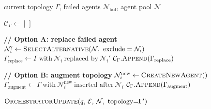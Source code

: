 \begin{algorithm}[H]
\caption{TopologyMutation (structural fallback)}
\begin{algorithmic}[1]
\Require current topology $\Gamma$, failed agents $\mathcal{N}_{\text{fail}}$, agent pool $\mathcal{N}$

\State $\mathcal{C}_{\Gamma} \leftarrow [\,]$


    \State \textbf{// Option A: replace failed agent}
    \State $\mathcal{N}_i' \leftarrow \textsc{SelectAlternative}(\mathcal{N},\ \text{exclude}=\mathcal{N}_i)$
    \State $\Gamma_{\text{replace}} \leftarrow \Gamma\ \text{with}\ \mathcal{N}_i\ \text{replaced by}\ \mathcal{N}_i'$
    \State $\mathcal{C}_{\Gamma}.\textsc{Append}(\Gamma_{\text{replace}})$

    \State \textbf{// Option B: augment topology}
    \State $\mathcal{N}_i^{\text{new}} \leftarrow \textsc{CreateNewAgent}()$
    \State $\Gamma_{\text{augment}} \leftarrow \Gamma\ \text{with}\ \mathcal{N}_i^{\text{new}}\ \text{inserted after}\ \mathcal{N}_i$
    \State $\mathcal{C}_{\Gamma}.\textsc{Append}(\Gamma_{\text{augment}})$

\EndFor

    \State $\textsc{OrchestratorUpdate}(q,\, \mathcal{E},\, \mathcal{N},\ \text{topology}{=}\Gamma')$
\EndFor
\end{algorithmic}
\end{algorithm}